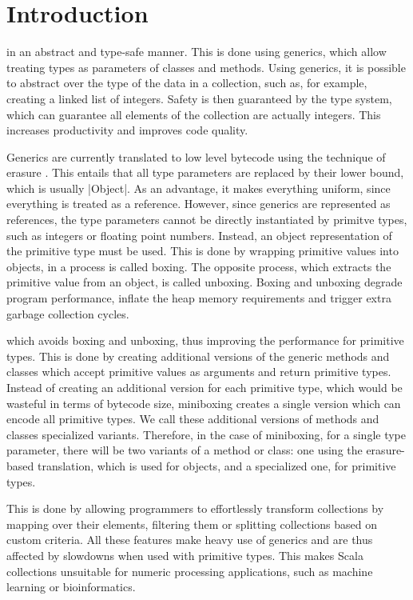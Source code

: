 \section{Introduction}

 in an abstract and type-safe manner. This is done using generics, which allow treating types as parameters of classes and methods. Using generics, it is possible to abstract over the type of the data in a collection, such as, for example, creating a linked list of integers. Safety is then guaranteed by the type system, which can guarantee all elements of the collection are actually integers. This increases productivity and improves code quality.

Generics are currently translated to low level bytecode using the technique of erasure \cite{java-erasure}. This entails that all type parameters are replaced by their lower bound, which is usually |Object|. As an advantage, it makes everything uniform, since everything is treated as a reference. However, since generics are represented as references, the type parameters cannot be directly instantiated by primitve types, such as integers or floating point numbers. Instead, an object representation of the primitive type must be used. This is done by wrapping primitive values into objects, in a process is called boxing. The opposite process, which extracts the primitive value from an object, is called unboxing. Boxing and unboxing degrade program performance, inflate the heap memory requirements and trigger extra garbage collection cycles.

 which avoids boxing and unboxing, thus improving the performance for primitive types. This is done by creating additional versions of the generic methods and classes which accept primitive values as arguments and return primitive types. Instead of creating an additional version for each primitive type, which would be wasteful in terms of bytecode size, miniboxing creates a single version which can encode all primitive types. We call these additional versions of methods and classes specialized variants. Therefore, in the case of miniboxing, for a single type parameter, there will be two variants of a method or class: one using the erasure-based translation, which is used for objects, and a specialized one, for primitive types.

 This is done by allowing programmers to effortlessly transform collections by mapping over their elements, filtering them or splitting collections based on custom criteria. All these features make heavy use of generics and are thus affected by slowdowns when used with primitive types. This makes Scala collections unsuitable for numeric processing applications, such as machine learning or bioinformatics.

